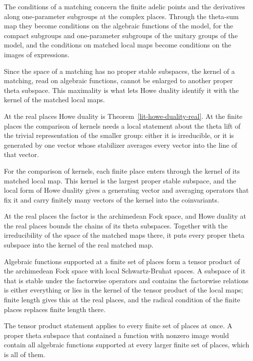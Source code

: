 The conditions of a matching concern the finite adelic points and the
derivatives along one-parameter subgroups at the complex places. Through the
theta-sum map they become conditions on the algebraic functions of the model,
for the compact subgroups and one-parameter subgroups of the unitary groups
of the model, and the conditions on matched local maps become conditions on
the images of expressions.

Since the space of a matching has no proper stable subspaces, the kernel of a
matching, read on algebraic functions, cannot be enlarged to another proper
theta subspace. This maximality is what lets Howe duality identify it with the
kernel of the matched local maps.

At the real places Howe duality is Theorem~\ref{lit-howe-duality-real}. At the
finite places the comparison of kernels needs a local statement about the
theta lift of the trivial representation of the smaller group: either it is
irreducible, or it is generated by one vector whose stabilizer averages every
vector into the line of that vector.

For the comparison of kernels, each finite place enters through the kernel of
its matched local map. This kernel is the largest proper stable subspace, and
the local form of Howe duality gives a generating vector and averaging
operators that fix it and carry finitely many vectors of the kernel into the
coinvariants.

At the real places the factor is the archimedean Fock space, and Howe duality
at the real places bounds the chains of its theta subspaces. Together with the
irreducibility of the space of the matched maps there, it puts every proper
theta subspace into the kernel of the real matched map.

Algebraic functions supported at a finite set of places form a tensor product
of the archimedean Fock space with local Schwartz-Bruhat spaces. A subspace of
it that is stable under the factorwise operators and contains the factorwise
relations is either everything or lies in the kernel of the tensor product of
the local maps; finite length gives this at the real places, and the radical
condition of the finite places replaces finite length there.

The tensor product statement applies to every finite set of places at once.
A proper theta subspace that contained a function with nonzero image would
contain all algebraic functions supported at every larger finite set of
places, which is all of them.

